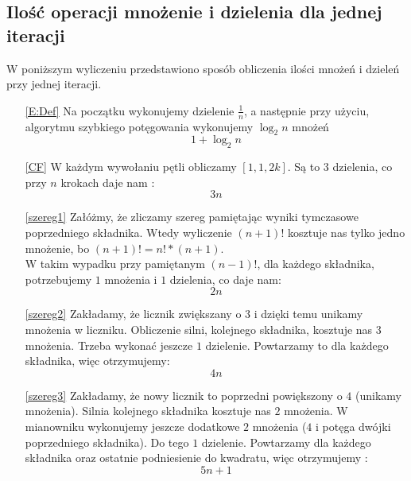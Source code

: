 \documentclass{article}
\begin{document}
\subsection{Ilość operacji mnożenie i dzielenia dla jednej iteracji}
	W poniższym wyliczeniu przedstawiono sposób obliczenia ilości mnożeń i dzieleń przy jednej iteracji. 
	\begin{enumerate}
		\item [\eqref{E:Def}] Na początku wykonujemy dzielenie $\frac{1}{n}$, a następnie przy użyciu, algorytmu szybkiego potęgowania wykonujemy $\log_{2}{n}$ mnożeń
		$$1+\log_{2}{n}$$
		
		\item [\eqref{CF}] W każdym wywołaniu pętli obliczamy $[1,1,2k]$. Są to $3$ dzielenia, co przy $n$ krokach daje nam :
		$$3n$$
		
		\item [\eqref{szereg1}]  Załóżmy, że zliczamy szereg pamiętając wyniki tymczasowe poprzedniego składnika. Wtedy wyliczenie $(n+1)!$ kosztuje nas tylko jedno mnożenie, bo $(n+1)! = n! * (n+1)$.
		\\ W takim wypadku przy pamiętanym $(n-1)!$, dla każdego składnika, potrzebujemy $1$ mnożenia i $1$ dzielenia, co daje nam:
		$$2n$$
		
		\item [\eqref{szereg2}] Zakładamy, że licznik zwiększany o $3$ i dzięki temu unikamy mnożenia w liczniku. Obliczenie silni, kolejnego składnika, kosztuje nas $3$ mnożenia. Trzeba wykonać jeszcze $1$ dzielenie. Powtarzamy to dla każdego składnika, więc otrzymujemy:
		$$4n$$
		
		\item[\eqref{szereg3}] Zakładamy, że nowy licznik to poprzedni powiększony o $4$ (unikamy mnożenia). Silnia kolejnego składnika kosztuje nas  $2$ mnożenia. W mianowniku wykonujemy jeszcze dodatkowe $2$ mnożenia ($4$ i potęga dwójki poprzedniego składnika). Do tego $1$ dzielenie. Powtarzamy dla każdego składnika oraz ostatnie podniesienie do kwadratu, więc otrzymujemy :
		$$5n + 1$$
	\end{enumerate}
\end{document}
